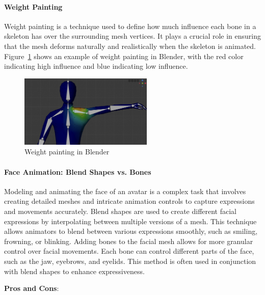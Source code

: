 \documentclass[../../main.tex]{subfiles}
\begin{document}
\paragraph{Weight Painting}
\label{ch:background_work:sign_language_synthesis:3d_techniques:mesh_and_texture:weight_painting}

Weight painting is a technique used to define how much influence each bone in a skeleton has over the surrounding mesh vertices. It plays a crucial role in ensuring that the mesh deforms naturally and realistically when the skeleton is animated. Figure~\ref{fig:weight_painting} shows an example of weight painting in Blender, with the red color indicating high influence and blue indicating low influence.

\begin{figure} 
  \centering \includegraphics[width = 2.5in]{chapters/background_work/images/weight_painting.png} 
  \caption{Weight painting in Blender} 
  \label{fig:weight_painting} 
\end{figure}

\paragraph{Face Animation: Blend Shapes vs. Bones}
\label{ch:background_work:sign_language_synthesis:3d_techniques:mesh_and_texture:face_animation_blend_shapes_vs_bones}

Modeling and animating the face of an avatar is a complex task that involves creating detailed meshes and intricate animation controls to capture expressions and movements accurately. Blend shapes are used to create different facial expressions by interpolating between multiple versions of a mesh. This technique allows animators to blend between various expressions smoothly, such as smiling, frowning, or blinking. Adding bones to the facial mesh allows for more granular control over facial movements. Each bone can control different parts of the face, such as the jaw, eyebrows, and eyelids. This method is often used in conjunction with blend shapes to enhance expressiveness.

\textbf{Pros and Cons}:
\end{document}
